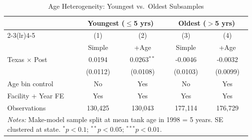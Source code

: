 \begin{table}[htbp]\centering
\caption{Age Heterogeneity: Youngest vs.\ Oldest Subsamples}
\label{tbl:mm_age_hte}
\begin{tabular}{lcccc}\toprule
 & \multicolumn{2}{c}{\textbf{Youngest ($\leq$5 yrs)}} & \multicolumn{2}{c}{\textbf{Oldest ($>$5 yrs)}}\\
\cmidrule(lr){2-3}\cmidrule(lr){4-5}
 & (1) & (2) & (3) & (4)\\ & Simple & +Age & Simple & +Age\\\midrule
Texas $\times$ Post & 0.0194 & 0.0263$^{**}$ & -0.0046 & -0.0032\\
 & (0.0112) & (0.0108) & (0.0103) & (0.0099)\\
\midrule
Age bin control & No & Yes & No & Yes\\
Facility + Year FE & Yes & Yes & Yes & Yes\\\midrule
Observations & 130,425 & 130,043 & 177,114 & 176,729\\
\bottomrule
\multicolumn{5}{p{0.95\textwidth}}{\footnotesize \textit{Notes:} 
Make-model sample split at mean tank age in 1998 = 5 years. 
SE clustered at state. $^{*}p<0.1$; $^{**}p<0.05$; $^{***}p<0.01$.}
\end{tabular}\end{table}

